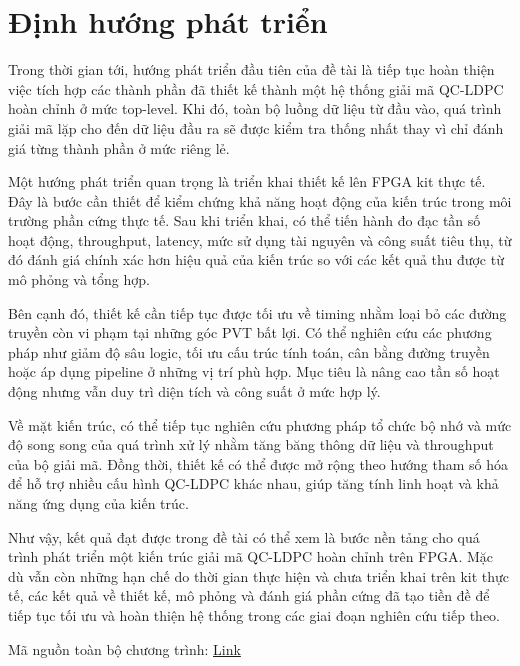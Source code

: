 \documentclass[12pt,a4paper,oneside]{book}
\begin{document}
\section{Định hướng phát triển}

Trong thời gian tới, hướng phát triển đầu tiên của đề tài là tiếp tục hoàn thiện việc tích hợp các thành phần đã thiết kế thành một hệ thống giải mã QC-LDPC hoàn chỉnh ở mức top-level. Khi đó, toàn bộ luồng dữ liệu từ đầu vào, quá trình giải mã lặp cho đến dữ liệu đầu ra sẽ được kiểm tra thống nhất thay vì chỉ đánh giá từng thành phần ở mức riêng lẻ.

Một hướng phát triển quan trọng là triển khai thiết kế lên FPGA kit thực tế. Đây là bước cần thiết để kiểm chứng khả năng hoạt động của kiến trúc trong môi trường phần cứng thực tế. Sau khi triển khai, có thể tiến hành đo đạc tần số hoạt động, throughput, latency, mức sử dụng tài nguyên và công suất tiêu thụ, từ đó đánh giá chính xác hơn hiệu quả của kiến trúc so với các kết quả thu được từ mô phỏng và tổng hợp.

Bên cạnh đó, thiết kế cần tiếp tục được tối ưu về timing nhằm loại bỏ các đường truyền còn vi phạm tại những góc PVT bất lợi. Có thể nghiên cứu các phương pháp như giảm độ sâu logic, tối ưu cấu trúc tính toán, cân bằng đường truyền hoặc áp dụng pipeline ở những vị trí phù hợp. Mục tiêu là nâng cao tần số hoạt động nhưng vẫn duy trì diện tích và công suất ở mức hợp lý.

Về mặt kiến trúc, có thể tiếp tục nghiên cứu phương pháp tổ chức bộ nhớ và mức độ song song của quá trình xử lý nhằm tăng băng thông dữ liệu và throughput của bộ giải mã. Đồng thời, thiết kế có thể được mở rộng theo hướng tham số hóa để hỗ trợ nhiều cấu hình QC-LDPC khác nhau, giúp tăng tính linh hoạt và khả năng ứng dụng của kiến trúc.

Như vậy, kết quả đạt được trong đề tài có thể xem là bước nền tảng cho quá trình phát triển một kiến trúc giải mã QC-LDPC hoàn chỉnh trên FPGA. Mặc dù vẫn còn những hạn chế do thời gian thực hiện và chưa triển khai trên kit thực tế, các kết quả về thiết kế, mô phỏng và đánh giá phần cứng đã tạo tiền đề để tiếp tục tối ưu và hoàn thiện hệ thống trong các giai đoạn nghiên cứu tiếp theo.


\printbibliography[title=Tài liệu tham khảo]

Mã nguồn toàn bộ chương trình: \href{https://github.com/Jacksurfer2005/SummerInternshipPorject/tree/main/code}{Link} 
\end{document}
